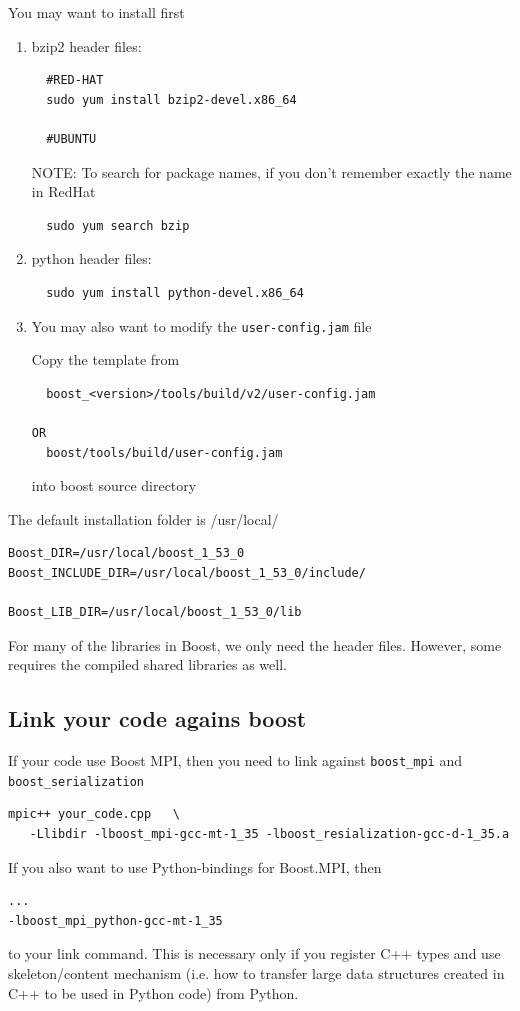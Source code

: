 You may want to install first
\begin{enumerate}
  \item bzip2 header files: 
  \begin{verbatim}
  #RED-HAT
  sudo yum install bzip2-devel.x86_64
  
  #UBUNTU
  \end{verbatim}
  NOTE: To search for package names, if you don't remember exactly the name in
  RedHat
  \begin{verbatim}
  sudo yum search bzip
  \end{verbatim}
  
  \item python header files:
  \begin{verbatim}
  sudo yum install python-devel.x86_64
  \end{verbatim}
  
  \item You may also want to modify the \verb!user-config.jam! file
  
  Copy the template from
  \begin{verbatim}
  boost_<version>/tools/build/v2/user-config.jam

OR
  boost/tools/build/user-config.jam

  \end{verbatim}
  into boost source directory
  
\end{enumerate}

The default installation folder is /usr/local/
\begin{verbatim}
Boost_DIR=/usr/local/boost_1_53_0
Boost_INCLUDE_DIR=/usr/local/boost_1_53_0/include/

Boost_LIB_DIR=/usr/local/boost_1_53_0/lib
\end{verbatim}
For many of the libraries in Boost, we only need the header files. However, some
requires the compiled shared libraries as well.

\subsection{Link your code agains boost}


If your code use Boost MPI, then you need to link against \verb!boost_mpi! and
\verb!boost_serialization!
\begin{verbatim}
mpic++ your_code.cpp   \
   -Llibdir -lboost_mpi-gcc-mt-1_35 -lboost_resialization-gcc-d-1_35.a
\end{verbatim}
If you also want to use Python-bindings for Boost.MPI, then
\begin{verbatim}
... 
-lboost_mpi_python-gcc-mt-1_35
\end{verbatim}
to your link command. This is necessary only if you register C++ types and use
skeleton/content mechanism (i.e. how to transfer large data structures
created in C++ to be used in Python code) from Python.

